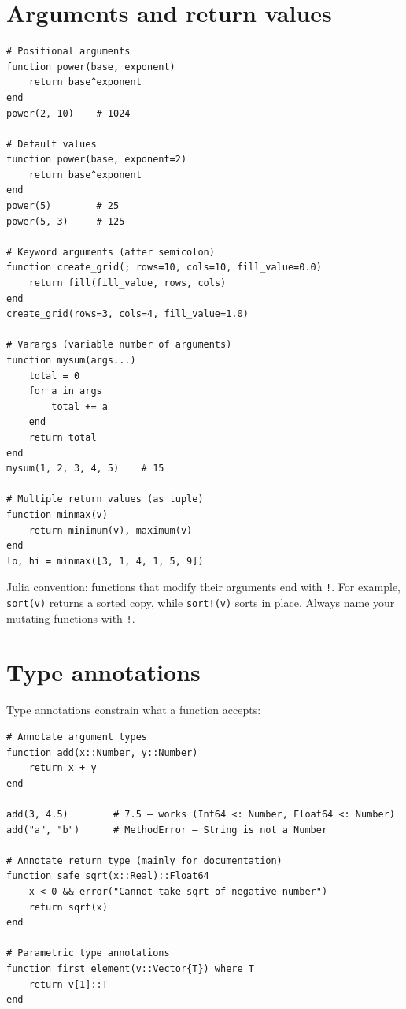\section{Arguments and return values}

\begin{verbatim}
# Positional arguments
function power(base, exponent)
    return base^exponent
end
power(2, 10)    # 1024

# Default values
function power(base, exponent=2)
    return base^exponent
end
power(5)        # 25
power(5, 3)     # 125

# Keyword arguments (after semicolon)
function create_grid(; rows=10, cols=10, fill_value=0.0)
    return fill(fill_value, rows, cols)
end
create_grid(rows=3, cols=4, fill_value=1.0)

# Varargs (variable number of arguments)
function mysum(args...)
    total = 0
    for a in args
        total += a
    end
    return total
end
mysum(1, 2, 3, 4, 5)    # 15

# Multiple return values (as tuple)
function minmax(v)
    return minimum(v), maximum(v)
end
lo, hi = minmax([3, 1, 4, 1, 5, 9])
\end{verbatim}

\begin{juliatip}
Julia convention: functions that modify their arguments end with \texttt{!}. For example, \texttt{sort(v)} returns a sorted copy, while \texttt{sort!(v)} sorts in place. Always name your mutating functions with \texttt{!}.
\end{juliatip}

\section{Type annotations}

Type annotations constrain what a function accepts:

\begin{verbatim}
# Annotate argument types
function add(x::Number, y::Number)
    return x + y
end

add(3, 4.5)        # 7.5 — works (Int64 <: Number, Float64 <: Number)
add("a", "b")      # MethodError — String is not a Number

# Annotate return type (mainly for documentation)
function safe_sqrt(x::Real)::Float64
    x < 0 && error("Cannot take sqrt of negative number")
    return sqrt(x)
end

# Parametric type annotations
function first_element(v::Vector{T}) where T
    return v[1]::T
end
\end{verbatim}

